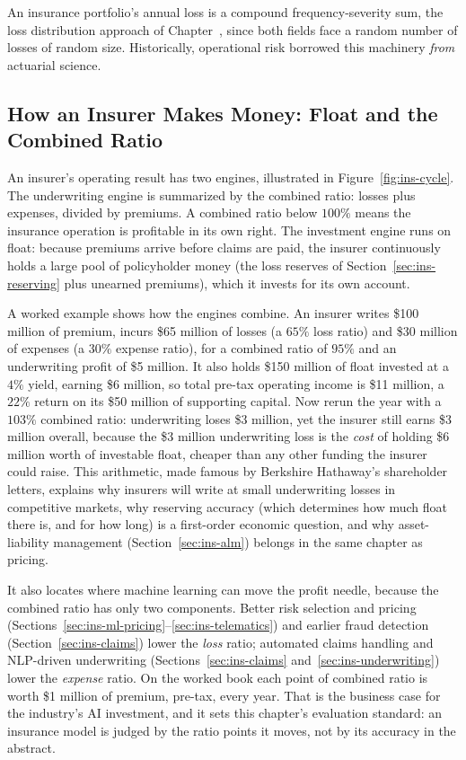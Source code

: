 \documentclass[../ai_in_finance]{subfiles}
\begin{document}
An insurance portfolio's annual loss is a compound frequency-severity sum, the loss distribution approach of Chapter~, since both fields face a random number of losses of random size. Historically, operational risk borrowed this machinery \emph{from} actuarial science.

\subsection{How an Insurer Makes Money: Float and the Combined Ratio}
\label{sec:ins-economics}

An insurer's operating result has two engines, illustrated in Figure~\ref{fig:ins-cycle}. The underwriting engine is summarized by the combined ratio: losses plus expenses, divided by premiums. A combined ratio below $100\%$ means the insurance operation is profitable in its own right. The investment engine runs on float: because premiums arrive before claims are paid, the insurer continuously holds a large pool of policyholder money (the loss reserves of Section~\ref{sec:ins-reserving} plus unearned premiums), which it invests for its own account.

A worked example shows how the engines combine. An insurer writes \$100 million of premium, incurs \$65 million of losses (a $65\%$ loss ratio) and \$30 million of expenses (a $30\%$ expense ratio), for a combined ratio of $95\%$ and an underwriting profit of \$5 million. It also holds \$150 million of float invested at a $4\%$ yield, earning \$6 million, so total pre-tax operating income is \$11 million, a $22\%$ return on its \$50 million of supporting capital. Now rerun the year with a $103\%$ combined ratio: underwriting loses \$3 million, yet the insurer still earns \$3 million overall, because the \$3 million underwriting loss is the \emph{cost} of holding \$6 million worth of investable float, cheaper than any other funding the insurer could raise. This arithmetic, made famous by Berkshire Hathaway's shareholder letters, explains why insurers will write at small underwriting losses in competitive markets, why reserving accuracy (which determines how much float there is, and for how long) is a first-order economic question, and why asset-liability management (Section~\ref{sec:ins-alm}) belongs in the same chapter as pricing.

It also locates where machine learning can move the profit needle, because the combined ratio has only two components. Better risk selection and pricing (Sections~\ref{sec:ins-ml-pricing}--\ref{sec:ins-telematics}) and earlier fraud detection (Section~\ref{sec:ins-claims}) lower the \emph{loss} ratio; automated claims handling and NLP-driven underwriting (Sections~\ref{sec:ins-claims} and~\ref{sec:ins-underwriting}) lower the \emph{expense} ratio. On the worked book each point of combined ratio is worth \$1 million of premium, pre-tax, every year. That is the business case for the industry's AI investment, and it sets this chapter's evaluation standard: an insurance model is judged by the ratio points it moves, not by its accuracy in the abstract.
\end{document}

